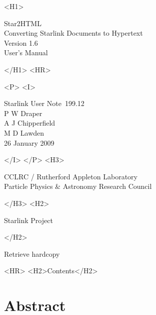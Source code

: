 \documentclass[twoside,11pt]{article}
\newcommand{\stardoccategory}  {Starlink User Note}
\newcommand{\stardocsource}    {sun\stardocnumber}
\newcommand{\stardocnumber}    {199.12}
\newcommand{\stardocauthors}   {P W Draper\\
                                A J Chipperfield\\
                                M D Lawden}
\newcommand{\stardocdate}      {26 January 2009}
\newcommand{\stardoctitle}     {Star2HTML\\[1ex]
                                Converting Starlink Documents to Hypertext}
\newcommand{\stardocversion}   {Version 1.6}
\newcommand{\stardocmanual}    {User's Manual}
\newcommand{\htmladdnormallink}[2]{#1}
\newcommand{\htmladdimg}[1]{}
\newcommand{\htmlref}[2]{#1}
\newcommand{\htmladdtonavigation}[1]{}
\newcommand{\xlabel}[1]{}
\renewcommand{\_}{\texttt{\symbol{95}}}
\begin{document}
\begin{htmlonly}
   \xlabel{}
   \begin{rawhtml} <H1> \end{rawhtml}
      \stardoctitle\\
      \stardocversion\\
      \stardocmanual
   \begin{rawhtml} </H1> <HR> \end{rawhtml}


   \begin{rawhtml} <P> <I> \end{rawhtml}
   \stardoccategory\ \stardocnumber \\
   \stardocauthors \\
   \stardocdate
   \begin{rawhtml} </I> </P> <H3> \end{rawhtml}
      \htmladdnormallink{CCLRC / Rutherford Appleton Laboratory}
                        {http://www.cclrc.ac.uk} \\
      \htmladdnormallink{Particle Physics \& Astronomy Research Council}
                        {http://www.pparc.ac.uk} \\
   \begin{rawhtml} </H3> <H2> \end{rawhtml}
      \htmladdnormallink{Starlink Project}{http://www.starlink.rl.ac.uk/}
   \begin{rawhtml} </H2> \end{rawhtml}
   \htmladdnormallink{\htmladdimg{source.gif} Retrieve hardcopy}
      {http://www.starlink.rl.ac.uk/cgi-bin/hcserver?\stardocsource}\\

  \label{stardoccontents}
  \begin{rawhtml}
    <HR>
    <H2>Contents</H2>
  \end{rawhtml}
  \htmladdtonavigation{\htmlref{\htmladdimg{contents_motif.gif}}
        {stardoccontents}}

  \section{\xlabel{abstract}Abstract}
\end{htmlonly}
\end{document}
